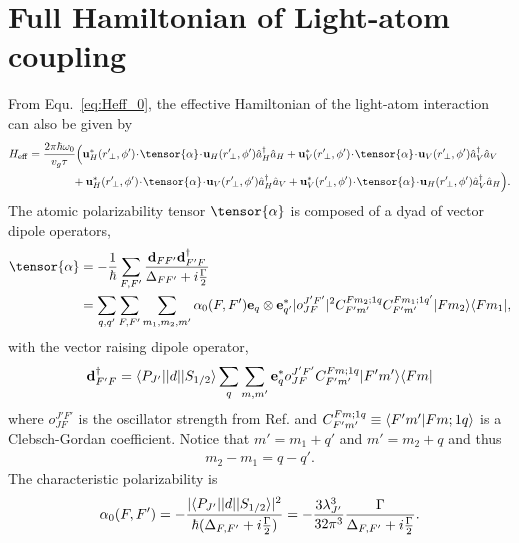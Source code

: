 \documentclass[preprint,aps,pra,onecolumn]{revtex4-1} %
\begin{document}
\section{Full Hamiltonian of Light-atom coupling}\label{sec:EffectiveHamiltonian_CG}
From Equ.~\eqref{eq:Heff_0}, the effective Hamiltonian of the light-atom interaction can also be given by
\begin{align}  
	H_{\rm eff}   = \frac{2\pi \hbar \omega_0}{ v_g \tau} &\Big( \mathbf{u}^*_H(r^\prime\!_\perp, \phi') 
	\!\cdot\! 
	\tensor{\alpha} \!\cdot\! \mathbf{u}_{H}(r^\prime\!_\perp, \phi') \hat{a}\dg_H \hat{a}_H +  
	\mathbf{u}^*_V(r^\prime\!_\perp, \phi')\! \cdot\! 
	\tensor{\alpha} \!\cdot\! \mathbf{u}_{V}(r^\prime\!_\perp, \phi') \hat{a}\dg_V \hat{a}_V \nonumber\\
	&\!\! + \mathbf{u}^*_H(r^\prime\!_\perp, \phi')\! \cdot\! \tensor{\alpha}\! \cdot\! 
	\mathbf{u}_{V}(r^\prime\!_\perp, \phi') \hat{a}\dg_H \hat{a}_V 
	+ \mathbf{u}^*_V(r^\prime\!_\perp, \phi') \!\cdot\! \tensor{\alpha}\! \cdot\! 
	\mathbf{u}_{H}(r^\prime\!_\perp, 
	\phi') \hat{a}\dg_V \hat{a}_H 
	\Big).  \label{eq:LightShiftHam_CG}
\end{align}
The atomic polarizability tensor $\tensor{\alpha}$ is composed of a dyad of vector dipole operators,    
\begin{align}
	\tensor{\alpha} & =  - \frac{1}{\hbar}  \sum_{F,F'} \frac{ \mathbf{d}_{FF'} \mathbf{d}^\dagger_{F'F} 
	}{\Delta_{FF'}+i\frac{\Gamma}{2} } \\
		& = \sum_{q,q'}  \sum_{F,F'} \sum_{m_1, m_2, m'} \alpha_0(F,F') \mathbf{e}_q \otimes 
		\mathbf{e}^*_{q'} | o^{J'F'}_{JF} |^2 C^{Fm_2;1q}_{F'm'} C^{Fm_1;1q'}_{F'm'} \op{F m_2}{F m_1},
\end{align}
with the vector raising  dipole operator,
\begin{align}
	\mathbf{d}^\dagger_{F'F} =  \langle{P_{J'}}\rvert| d |\lvert{S_{1/2}}\rangle \sum_q \sum_{m,m'} \mathbf{e}_q^* 
	o^{J'F'}_{JF} C^{Fm;1q}_{F'm'} \lvert{F'm'}\rangle\langle{Fm}\rvert
\end{align}
where $o^{J'F'}_{JF}$ is the oscillator strength from Ref. \cite{Deutsch2010a} and $C^{Fm;1q}_{F'm'} 
\equiv 
\langle{F'm'}|{Fm;1q}\rangle$ is a Clebsch-Gordan coefficient. 
Notice that $m' = m_1 + q'$ and $m' = m_2 + q$ and thus
\begin{align}
	m_2 - m_1 = q-q'.
\end{align}
The characteristic polarizability is
\begin{align} \label{eq:CharacteristicPolarizability}
	\alpha_0(F,F') = - \frac{ |\langle{P_{J'}}\rvert| d |\lvert{S_{1/2}}\rangle|^2 }{\hbar (\Delta_{F,F'}+i\frac{\Gamma}{2})} = - 
	\frac{3 
	\lambda_{J'}^3}{32 \pi^3} \frac{\Gamma}{\Delta_{F,F'}+i\frac{\Gamma}{2}}.
\end{align}
\end{document}
